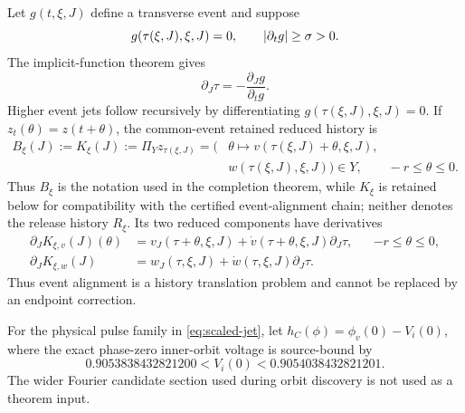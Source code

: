 Let \(g(t,\xi,J)\) define a transverse event and suppose
\begin{equation}
 g(\tau(\xi,J),\xi,J)=0,\qquad
 \left\lvert\partial_tg\right\rvert\ge\sigma>0.                         \label{eq:event-speed}
\end{equation}
The implicit-function theorem gives
\begin{equation}
 \partial_J\tau=-\frac{\partial_Jg}{\partial_tg}.       \label{eq:event-first-jet}
\end{equation}
Higher event jets follow recursively by differentiating
\(g(\tau(\xi,J),\xi,J)=0\).  If
\(z_t(\theta)=z(t+\theta)\), the common-event retained reduced history is
\begin{equation}
 \begin{split}
 B_\xi(J):=K_\xi(J):=\Pi_Yz_{\tau(\xi,J)}
   =\bigl(&\theta\longmapsto
       v(\tau(\xi,J)+\theta,\xi,J),\\
          &w(\tau(\xi,J),\xi,J)\bigr)\in Y,
 \qquad-r\le\theta\le0.                                \label{eq:event-history}
 \end{split}
\end{equation}
Thus \(B_\xi\) is the notation used in the completion theorem, while
\(K_\xi\) is retained below for compatibility with the certified
event-alignment chain; neither denotes the release history \(R_\xi\).
Its two reduced components have derivatives
\begin{align*}
 \partial_JK_{\xi,v}(J)(\theta)
 &=v_J(\tau+\theta,\xi,J)
   +\dot v(\tau+\theta,\xi,J)\partial_J\tau,
   &&-r\le\theta\le0,\\
 \partial_JK_{\xi,w}(J)
 &=w_J(\tau,\xi,J)+\dot w(\tau,\xi,J)\partial_J\tau.
\end{align*}
Thus event alignment is a history translation problem and cannot be
replaced by an endpoint correction.

For the physical pulse family in \cref{eq:scaled-jet}, let
\(h_C(\phi)=\phi_v(0)-V_i(0)\), where the exact phase-zero inner-orbit
voltage is source-bound by
\begin{equation}
 0.9053838432821200<V_i(0)<0.9054038432821201.          \label{eq:route-c-level}
\end{equation}
The wider Fourier candidate section used during orbit discovery is not used
as a theorem input.

